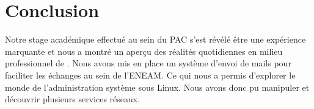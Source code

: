 \documentclass[a4paper,12pt,french]{report} %
\begin{document}
\chapter*{Conclusion}
Notre stage académique effectué au sein du PAC s'est révélé être une expérience marquante et nous a montré un aperçu des réalités quotidiennes en milieu professionnel de .
Nous avons mis en place un système d'envoi de mails pour faciliter les échanges au sein de l'ENEAM. Ce qui nous a permis d'explorer le monde de l'administration système sous Linux. Nous avons donc pu manipuler et découvrir plusieurs services réseaux. 


\nocite{ref1}
\nocite{ref2}
\nocite{ref3}
\nocite{ref4}
\nocite{ref5}
\nocite{ref6}
\nocite{ref7}
\nocite{ref8}
\nocite{ref9}
\nocite{ref10}
\nocite{ref11}
\nocite{ref12}
\nocite{ref13}
\nocite{ref14}
\nocite{ref15}
\nocite{ref16}

\end{document}
